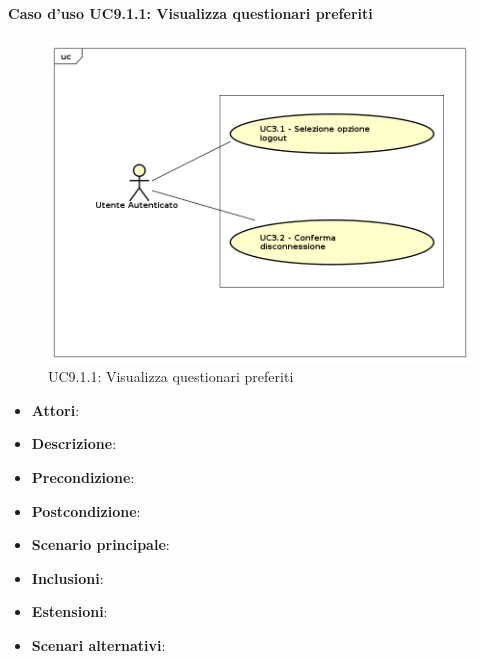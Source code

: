 		\paragraph{Caso d'uso UC9.1.1: Visualizza questionari preferiti}
		\label{UC9.1.1}
		\begin{figure}[h]
			\centering
		\includegraphics[scale=0.7,keepaspectratio]{UML/UC9.png}
			\caption{UC9.1.1: Visualizza questionari preferiti}
		\end{figure}
		\FloatBarrier
		\begin{itemize}
			\item \textbf{Attori}: 
			\item \textbf{Descrizione}: 
			\item \textbf{Precondizione}: 
			\item \textbf{Postcondizione}: 
			\item \textbf{Scenario principale}:
			\item \textbf{Inclusioni}:
			\item \textbf{Estensioni}:
			\item \textbf{Scenari alternativi}:
		\end{itemize}
		
